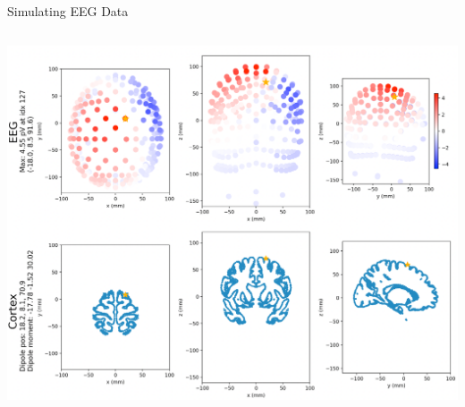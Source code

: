 \documentclass[aspectratio=169]{beamer}
\begin{document}
\begin{frame}{Simulating EEG Data}
\begin{columns}
\begin{column}{0.5\textwidth}
            \includegraphics[width=\textwidth]{figures/cortex.png}
        \end{column}
    \end{columns}
\end{frame}
\end{document}
